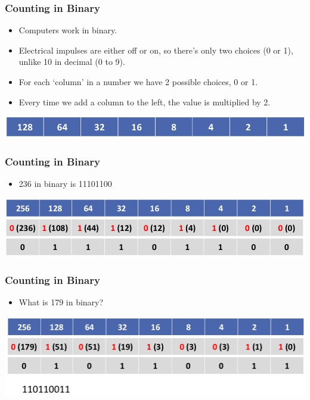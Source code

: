 \documentclass[pdflatex,compress]{beamer}
\begin{document}
\begin{frame}
	\frametitle{Counting in Binary}
	\begin{itemize}
		\item Computers work in binary.
		\item Electrical impulses are either off or on, so there’s only two choices (0 or 1), unlike 10 in decimal (0 to 9).
		\item For each ‘column’ in a number we have 2 possible choices, 0 or 1.
		\item Every time we add a column to the left, the value is multiplied by 2.
	\end{itemize}
	\begin{center}
		\includegraphics[width=0.8\linewidth]{img/img16}
	\end{center}
\end{frame}

\begin{frame}
	\frametitle{Counting in Binary}
	\begin{itemize}
		\item 236 in binary is 11101100
	\end{itemize}
	\begin{center}
		\includegraphics[width=0.9\linewidth]{img/img17}
	\end{center}
\end{frame}

\begin{frame}
	\frametitle{Counting in Binary}
	\begin{itemize}
		\item What is 179 in binary?
	\end{itemize}
	\begin{center}
		\includegraphics[width=0.9\linewidth]{img/img18}
	\end{center}
\end{frame}
\end{document}
